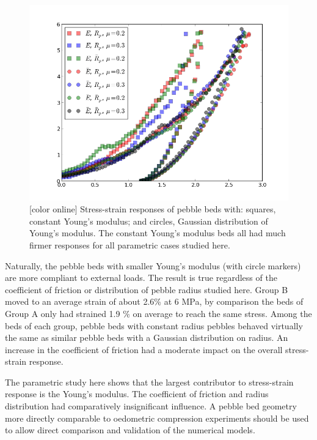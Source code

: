 \begin{figure}[t]
  \centering
  \includegraphics[width = 0.75 \textwidth]{chapters/figures/stress-strain}
  \caption{[color online] Stress-strain responses of pebble beds with: squares, constant Young's modulus; and circles, Gaussian distribution of Young's modulus. The constant Young's modulus beds all had much firmer responses for all parametric cases studied here.}\label{fig:stress-strain}
\end{figure}

Naturally, the pebble beds with smaller Young’s modulus (with circle markers) are more compliant to external loads. The result is true regardless of the coefficient of friction or distribution of pebble radius studied here. Group B moved to an average strain of about 2.6\% at 6 MPa, by comparison the beds of Group A only had strained 1.9 \% on average to reach the same stress. Among the beds of each group, pebble beds with constant radius pebbles behaved virtually the same as similar pebble beds with a Gaussian distribution on radius. An increase in the coefficient of friction had a moderate impact on the overall stress-strain response. 


The parametric study here shows that the largest contributor to stress-strain response is the Young’s modulus. The coefficient of friction and radius distribution had comparatively insignificant influence. A pebble bed geometry more directly comparable to oedometric compression experiments should be used to allow direct comparison and validation of the numerical models.


